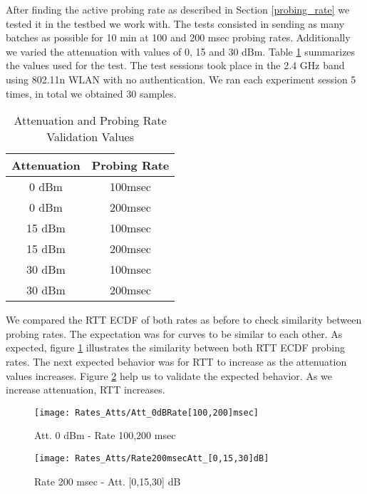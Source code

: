 After finding the active probing rate as described in Section \ref{probing_rate} we tested it in the testbed we work with. The tests consisted in sending as many batches as possible for 10 min at 100 and 200 msec probing rates. Additionally we varied the attenuation with values of 0, 15 and 30 dBm. Table \ref{table:Att_Rate_Test_Values} summarizes the values used for the test. The test sessions took place in the 2.4 GHz band using 802.11n WLAN with no authentication. We ran each experiment session 5 times, in total we obtained 30 samples.

\begin{table}[h]
	\begin{center}
		\begin{tabular}{||c c||}
			\hline
			Attenuation & Probing Rate\\ [0.5ex] 
			\hline\hline
			0 dBm & 100msec\\ 
			\hline
			0 dBm & 200msec\\
			\hline
			15 dBm & 100msec\\
			\hline
			15 dBm & 200msec\\
			\hline
			30 dBm & 100msec\\
			\hline
			30 dBm & 200msec\\ [1ex] 
			\hline
		\end{tabular}
	\end{center}
	\caption{Attenuation and Probing Rate Validation Values}
	\label{table:Att_Rate_Test_Values}
\end{table}

We compared the RTT ECDF of both rates as before to check similarity between probing rates. The expectation was for curves to be similar to each other. As expected, figure \ref{fig:att_0_100and200msec} illustrates the similarity between both RTT ECDF probing rates. The next expected behavior was for RTT to increase as the attenuation values increases. Figure \ref{fig:rate_200msec_Att_0_15_30dBm} help us to validate the expected behavior. As we increase attenuation, RTT increases.

\begin{figure*}[t]
	\begin{subfigure}[t]{.53\textwidth}
		\centering
		\texttt{[image: Rates\_Atts/Att\_0dBRate[100,200]msec]}
		\caption{Att. 0 dBm - Rate 100,200 msec}
		\label{fig:att_0_100and200msec}
	\end{subfigure}\hfill
	\begin{subfigure}[t]{.53\textwidth}
		\centering
		\texttt{[image: Rates\_Atts/Rate200msecAtt\_[0,15,30]dB]}
		\caption{Rate 200 msec - Att. [0,15,30] dB}
		\label{fig:rate_200msec_Att_0_15_30dBm}
	\end{subfigure}
	\caption{RTT ECDFs for Attenuation and Probing Rate in Testbed}
\end{figure*}
\newpage